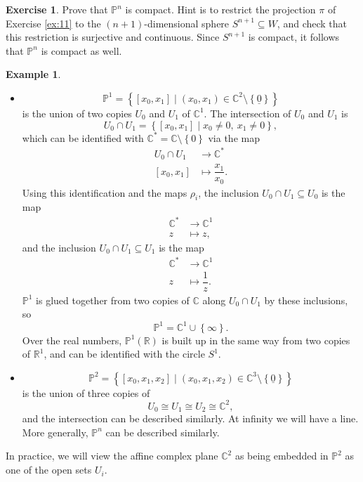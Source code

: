 \documentclass{article}
\newcommand{\R}{\mathbb{R}}
\newcommand{\C}{\mathbb{C}}
\renewcommand{\P}{\mathbb{P}}
\newcommand{\rb}[1]{\left( #1 \right)}
\renewcommand{\sb}[1]{\left[ #1 \right]}
\newcommand{\cb}[1]{\left\{ #1 \right\}}
\theoremstyle{definition}\newtheorem{definition}{Definition}[section]
\theoremstyle{definition}\newtheorem{notation}[definition]{Notation}
\theoremstyle{definition}\newtheorem{remark}[definition]{Remark}
\theoremstyle{definition}\newtheorem{example1}[definition]{Example}
\theoremstyle{definition}\newtheorem{fact}{Fact}
\theoremstyle{definition}\newtheorem{exercise}{Exercise}
\theoremstyle{definition}\newtheorem*{example2}{Example}
\begin{document}
\begin{exercise}
\label{ex:12}
Prove that $ \P^n $ is compact. Hint is to restrict the projection $ \pi $ of Exercise \ref{ex:11} to the $ \rb{n + 1} $-dimensional sphere $ S^{n + 1} \subseteq W $, and check that this restriction is surjective and continuous. Since $ S^{n + 1} $ is compact, it follows that $ \P^n $ is compact as well.
\end{exercise}

\begin{example1}
\hfill
\begin{itemize}
\item
$$ \P^1 = \cb{\sb{x_0, x_1} \mid \rb{x_0, x_1} \in \C^2 \setminus \cb{\underline{0}}} $$
is the union of two copies $ U_0 $ and $ U_1 $ of $ \C^1 $. The intersection of $ U_0 $ and $ U_1 $ is
$$ U_0 \cap U_1 = \cb{\sb{x_0, x_1} \mid x_0 \ne 0, \ x_1 \ne 0}, $$
which can be identified with $ \C^* = \C \setminus \cb{0} $ via the map
\begin{align*}
U_0 \cap U_1 & \to \C^* \\
\sb{x_0, x_1} & \mapsto \dfrac{x_1}{x_0}.
\end{align*}
Using this identification and the maps $ \rho_i $, the inclusion $ U_0 \cap U_1 \subseteq U_0 $ is the map
\begin{align*}
\C^* & \to \C^1 \\
z & \mapsto z,
\end{align*}
and the inclusion $ U_0 \cap U_1 \subseteq U_1 $ is the map
\begin{align*}
\C^* & \to \C^1 \\
z & \mapsto \dfrac{1}{z}.
\end{align*}
$ \P^1 $ is glued together from two copies of $ \C $ along $ U_0 \cap U_1 $ by these inclusions, so
$$ \P^1 = \C^1 \cup \cb{\infty}. $$
Over the real numbers, $ \P^1\rb{\R} $ is built up in the same way from two copies of $ \R^1 $, and can be identified with the circle $ S^1 $.
\item
$$ \P^2 = \cb{\sb{x_0, x_1, x_2} \mid \rb{x_0, x_1, x_2} \in \C^3 \setminus \cb{\underline{0}}} $$
is the union of three copies of
$$ U_0 \cong U_1 \cong U_2 \cong \C^2, $$
and the intersection can be described similarly. At infinity we will have a line. More generally, $ \P^n $ can be described similarly.
\end{itemize}
\end{example1}

In practice, we will view the affine complex plane $ \C^2 $ as being embedded in $ \P^2 $ as one of the open sets $ U_i $.
\end{document}
